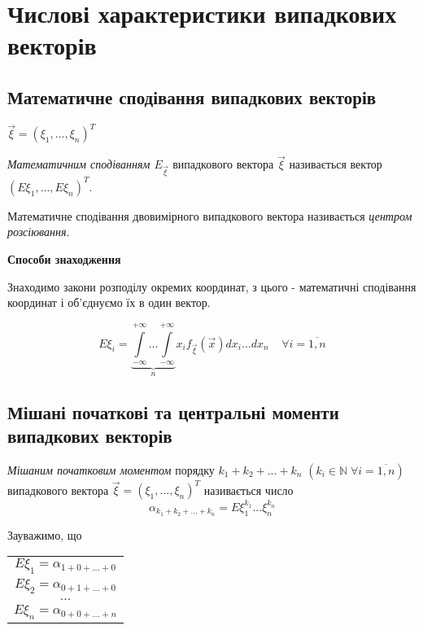 \section{Числові характеристики випадкових векторів}

\subsection{Математичне сподівання випадкових векторів}
$\vec{\xi} = \left(\xi_1, ..., \xi_n\right)^T$
\begin{definition}
    \emph{Математичним сподіванням $E_{\vec{\xi}}$} 
    випадкового вектора $\vec{\xi}$ називається вектор 
    $\left(E{\xi_1}, ..., E{\xi_n}\right)^T$.
\end{definition}
\begin{remark}
    Математичне сподівання двовимірного випадкового вектора 
    називається \emph{центром розсіювання}.
\end{remark}

\noindent \textbf{Способи знаходження}

Знаходимо закони розподілу окремих координат, з цього - 
математичні сподівання координат і об'єднуємо їх в один вектор.

\begin{equation}
    E{\xi_i} = 
    \underbrace{
        \int\limits_{-\infty}^{+\infty} 
        ... 
        \int\limits_{-\infty}^{+\infty}
    }_{n} x_i f_{\vec{\xi}}(\vec{x})dx_i...dx_n 
    \;\;\;\;
    \forall i = \overline{1,n}
\end{equation}

\subsection{Мішані початкові та центральні 
            моменти випадкових векторів}
\begin{definition}
    \emph{Мішаним початковим моментом} порядку 
    $k_1+k_2+...+k_n$ 
    $\left(k_i \in \mathbb{N} \; \forall i = \overline{1,n}
    \right)$
    випадкового вектора 
    $\vec{\xi} = \left(\xi_1, ..., \xi_n\right)^T$
    називається число
    \begin{equation*}
        \alpha_{k_1+k_2+...+k_n} = 
        E{\xi_1^{k_1}...\xi_n^{k_n}}
    \end{equation*}
\end{definition}
\begin{remark}
    Зауважимо, що
    \begin{center}
        \begin{tabular}{c}
            $E\xi_1 = \alpha_{1+0+...+0}$ \\
            $E\xi_2 = \alpha_{0+1+...+0}$ \\
            $...$ \\
            $E\xi_n = \alpha_{0+0+...+n}$
        \end{tabular}
    \end{center}
\end{remark}
